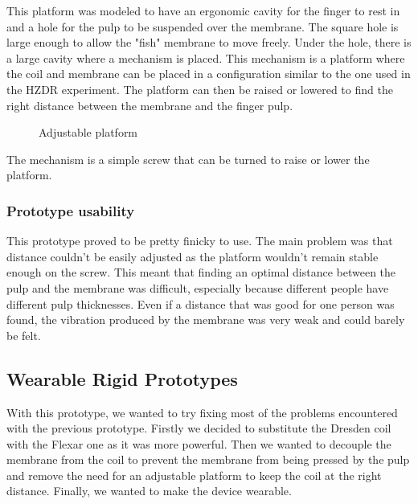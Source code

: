 This platform was modeled to have an ergonomic cavity for the finger to rest in and a hole for the pulp to be suspended over the membrane.
The square hole is large enough to allow the "fish" membrane to move freely.
Under the hole, there is a large cavity where a mechanism is placed.
This mechanism is a platform where the coil and membrane can be placed in a configuration similar to the one used in the HZDR experiment.
The platform can then be raised or lowered to find the right distance between the membrane and the finger pulp.
\begin{figure}
    \centering
    \caption{Adjustable platform}
    \label{fig: adj_platform}
\end{figure}
The mechanism is a simple screw that can be turned to raise or lower the platform.

\subsubsection{Prototype usability}
This prototype proved to be pretty finicky to use.
The main problem was that distance couldn't be easily adjusted as the platform wouldn't remain stable enough on the screw.
This meant that finding an optimal distance between the pulp and the membrane was difficult, especially because different people have different pulp thicknesses.
Even if a distance that was good for one person was found, the vibration produced by the membrane was very weak and could barely be felt.

\subsection{Wearable Rigid Prototypes}
With this prototype, we wanted to try fixing most of the problems encountered with the previous prototype.
Firstly we decided to substitute the Dresden coil with the Flexar one as it was more powerful.
Then we wanted to decouple the membrane from the coil to prevent the membrane from being pressed by the pulp and remove the need for an adjustable platform to keep the coil at the right distance.
Finally, we wanted to make the device wearable.

